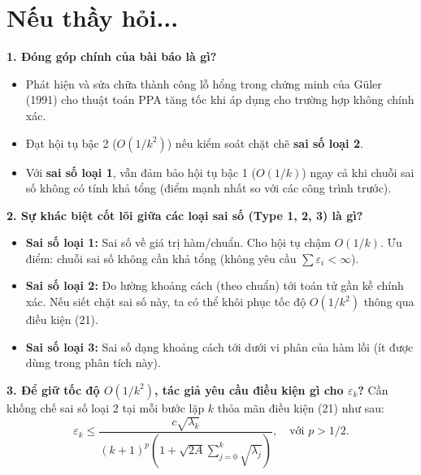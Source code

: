 ﻿\documentclass[12pt]{article}
\begin{document}
\section*{Nếu thầy hỏi...}
\textbf{1. Đóng góp chính của bài báo là gì?}
\begin{itemize}
    \item Phát hiện và sửa chữa thành công lỗ hổng trong chứng minh của Güler (1991) cho thuật toán PPA tăng tốc khi áp dụng cho trường hợp không chính xác.
    \item Đạt hội tụ bậc 2 (\(O(1/k^2)\)) nếu kiểm soát chặt chẽ \textbf{sai số loại 2}.
    \item Với \textbf{sai số loại 1}, vẫn đảm bảo hội tụ bậc 1 (\(O(1/k)\)) ngay cả khi chuỗi sai số không có tính khả tổng (điểm mạnh nhất so với các công trình trước).
\end{itemize}

\textbf{2. Sự khác biệt cốt lõi giữa các loại sai số (Type 1, 2, 3) là gì?}
\begin{itemize}
    \item \textbf{Sai số loại 1:} Sai số về giá trị hàm/chuẩn. Cho hội tụ chậm \(O(1/k)\). Ưu điểm: chuỗi sai số không cần khả tổng (không yêu cầu \(\sum \varepsilon_i < \infty\)).
    \item \textbf{Sai số loại 2:} Đo lường khoảng cách (theo chuẩn) tới toán tử gần kề chính xác. Nếu siết chặt sai số này, ta có thể khôi phục tốc độ \(O(1/k^2)\) thông qua điều kiện (21).
    \item \textbf{Sai số loại 3:} Sai số dạng khoảng cách tới dưới vi phân của hàm lồi (ít được dùng trong phân tích này).
\end{itemize}

\textbf{3. Để giữ tốc độ \(O(1/k^2)\), tác giả yêu cầu điều kiện gì cho \(\varepsilon_k\)?}
Cần khống chế sai số loại 2 tại mỗi bước lặp \(k\) thỏa mãn điều kiện (21) như sau:
\begin{equation*}
    \varepsilon_k \le \frac{c\sqrt{\lambda_k}}{(k+1)^p\left(1 + \sqrt{2A} \sum_{j=0}^{k} \sqrt{\lambda_j}\right)}, \quad \text{với } p > 1/2. \tag{21}
\end{equation*}
\end{document}

